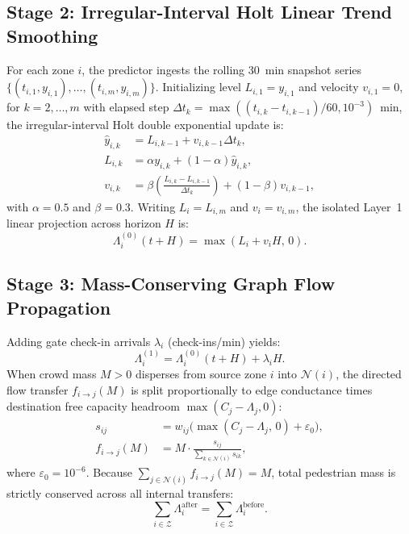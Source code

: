 \documentclass[conference,a4paper]{IEEEtran}
\begin{document}
\subsection{Stage 2: Irregular-Interval Holt Linear Trend Smoothing}
For each zone $i$, the predictor ingests the rolling 30~min snapshot series $\{(t_{i,1}, y_{i,1}), \dots, (t_{i,m}, y_{i,m})\}$. Initializing level $L_{i,1} = y_{i,1}$ and velocity $v_{i,1} = 0$, for $k = 2, \dots, m$ with elapsed step $\Delta t_k = \max((t_{i,k} - t_{i,k-1})/60, 10^{-3})$~min, the irregular-interval Holt double exponential update \cite{holt2004} is:
\begin{equation}
\begin{aligned}
\hat{y}_{i,k} &= L_{i,k-1} + v_{i,k-1} \Delta t_k, \\
L_{i,k} &= \alpha y_{i,k} + (1 - \alpha)\hat{y}_{i,k}, \\
v_{i,k} &= \beta \left(\frac{L_{i,k} - L_{i,k-1}}{\Delta t_k}\right) + (1 - \beta)v_{i,k-1},
\end{aligned}
\label{eq:holt}
\end{equation}
with $\alpha = 0.5$ and $\beta = 0.3$. Writing $L_i = L_{i,m}$ and $v_i = v_{i,m}$, the isolated Layer~1 linear projection across horizon $H$ is:
\begin{equation}
\Lambda_i^{(0)}(t + H) = \max(L_i + v_i H,\, 0).
\label{eq:l1_proj}
\end{equation}

\subsection{Stage 3: Mass-Conserving Graph Flow Propagation}
Adding gate check-in arrivals $\lambda_i$ (check-ins/min) yields:
\begin{equation}
\Lambda_i^{(1)} = \Lambda_i^{(0)}(t + H) + \lambda_i H.
\label{eq:gate_inflow}
\end{equation}
When crowd mass $M > 0$ disperses from source zone $i$ into $\mathcal{N}(i)$, the directed flow transfer $f_{i \to j}(M)$ is split proportionally to edge conductance times destination free capacity headroom $\max(C_j - \Lambda_j, 0)$:
\begin{equation}
\begin{aligned}
s_{ij} &= w_{ij}\big(\max(C_j - \Lambda_j,\, 0) + \varepsilon_0\big), \\
f_{i \to j}(M) &= M \cdot \frac{s_{ij}}{\sum_{k \in \mathcal{N}(i)} s_{ik}},
\end{aligned}
\label{eq:distribute}
\end{equation}
where $\varepsilon_0 = 10^{-6}$. Because $\sum_{j \in \mathcal{N}(i)} f_{i \to j}(M) = M$, total pedestrian mass is strictly conserved across all internal transfers:
\begin{equation}
\sum_{i \in \mathcal{Z}} \Lambda_i^{\mathrm{after}} = \sum_{i \in \mathcal{Z}} \Lambda_i^{\mathrm{before}}.
\label{eq:mass_conservation}
\end{equation}
\end{document}
